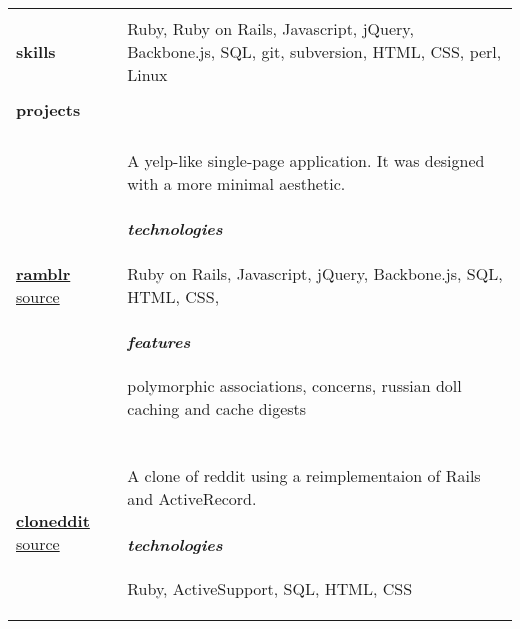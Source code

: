\documentclass{article}
\begin{document}
\begin{tabular}{L{3cm} R{14.5cm}}
    
    \hline \\

    \large{\textbf{skills}}
    \normalsize

    &

    Ruby, Ruby on Rails, Javascript, jQuery, Backbone.js, SQL, git, 
    subversion, HTML, CSS, perl, Linux
    
    \\ \hline \\

    \large{\textbf{projects}} \\\\
    \normalsize
    
    \href{http://www.ramblr.co}{\large{\textbf{ramblr}}}
    \normalsize
    \newline
    \href{https://github.com/kellyjospehprice/ramblr}{source}
    
    &
    
    A yelp-like single-page application. It was designed with a more
    minimal aesthetic.

    \paragraph{\textit{technologies}}{
        Ruby on Rails, Javascript, jQuery, Backbone.js, SQL, HTML, CSS,
    }

    \paragraph{\textit{features}}{
        polymorphic associations, concerns, russian doll caching and cache 
        digests
    }

    \\\\
    
    \href{http://klog.io/cloneddit}{\large{\textbf{cloneddit}}}
    \normalsize
    \newline
    \href{https://github.com/kellyjospehprice/cloneddit}{source}
    
    &
    
    A clone of reddit using a reimplementaion of Rails and
    ActiveRecord.

    \paragraph{\textit{technologies}}{
        Ruby, ActiveSupport, SQL, HTML, CSS
    }


\end{tabular}
\end{document}
